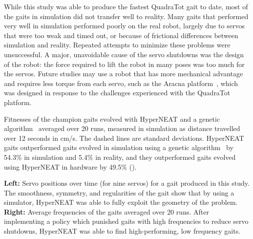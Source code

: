 While this study was able to produce the fastest QuadraTot gait to
date, most of the gaits in simulation did not transfer well to
reality. Many gaits that performed very well in simulation performed
poorly on the real robot, largely due to servos that were too weak and
timed out, or because of frictional differences between simulation and
reality. Repeated attempts to minimize these problems were
unsuccessful.  A major, unavoidable cause of the servo shutdowns was
the design of the robot: the force required to lift the robot in many
poses was too much for the servos. Future studies may use a
robot that has more mechanical advantage and requires less torque from
each servo, such as the Aracna platform~\cite{lohmann2012aracna},
which was designed in response to the challenges experienced with the
QuadraTot platform.

{Fitnesses of the champion gaits evolved with HyperNEAT and a genetic
algorithm~\cite{glete} averaged over 20 runs, measured in simulation
as distance travelled over 12 seconds in cm/s. The dashed lines are
standard deviations. HyperNEAT gaits outperformed gaits evolved in
simulation using a genetic algorithm~\cite{glette} by 54.3\% in
simulation and 5.4\% in reality, and they outperformed gaits evolved
using HyperNEAT in hardware by 49.5\% ().}

{\textbf{Left: }
Servo positions over time (for nine servos) for a gait produced in
this study. The smoothness, symmetry, and regularities of the gait
show that by using a simulator, HyperNEAT was able to fully exploit
the geometry of the problem.
\textbf{Right: }Average frequencies of the gaits averaged over 20 runs. 
After implementing a policy which
punished gaits with high frequencies to reduce servo shutdowns,
HyperNEAT was able to find high-performing, low frequency
gaits.}










